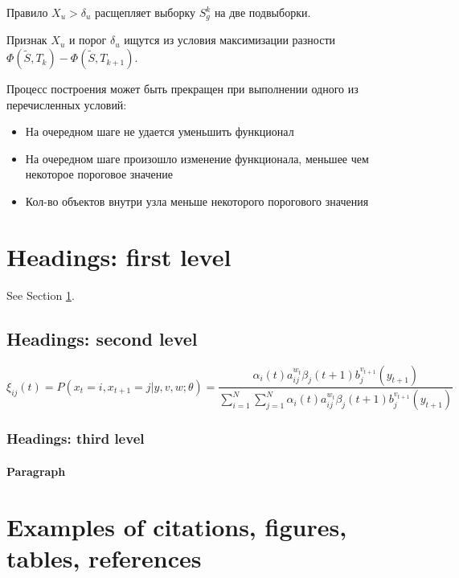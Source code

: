 \documentclass{article}
\begin{document}
Правило $X_u > \delta_u$ расщепляет выборку $S_g^k$ на две подвыборки.

Признак $X_u$ и порог $\delta_u$ ищутся из условия максимизации разности $\Phi(\tilde{S}, T_k) - \Phi(\tilde{S}, T_{k + 1})$.

Процесс построения может быть прекращен при выполнении одного из перечисленных условий:

\begin{itemize}
	\item На очередном шаге не удается уменьшить функционал
	\item На очередном шаге произошло изменение функционала, меньшее чем некоторое пороговое значение
	\item Кол-во объектов внутри узла меньше некоторого порогового значения
\end{itemize}


\vspace{1.3cm}

\section{Headings: first level}
\label{sec:headings}

\lipsum[4] See Section \ref{sec:headings}.

\subsection{Headings: second level}
\lipsum[5]
\begin{equation}
	\xi _{ij}(t)=P(x_{t}=i,x_{t+1}=j|y,v,w;\theta)= {\frac {\alpha _{i}(t)a^{w_t}_{ij}\beta _{j}(t+1)b^{v_{t+1}}_{j}(y_{t+1})}{\sum _{i=1}^{N} \sum _{j=1}^{N} \alpha _{i}(t)a^{w_t}_{ij}\beta _{j}(t+1)b^{v_{t+1}}_{j}(y_{t+1})}}
\end{equation}

\subsubsection{Headings: third level}
\lipsum[6]

\paragraph{Paragraph}
\lipsum[7]



\section{Examples of citations, figures, tables, references}
\label{sec:others}
\end{document}
